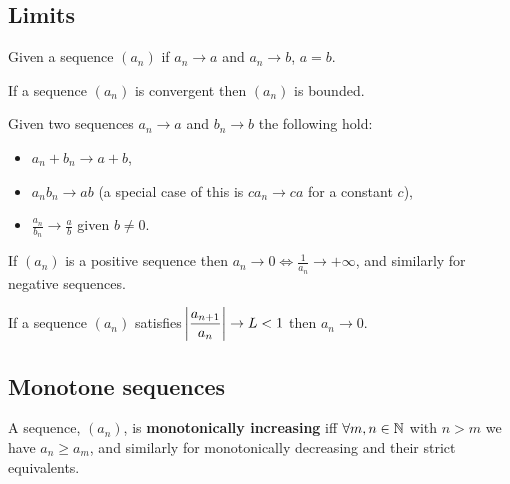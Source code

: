 \documentclass{article}
\begin{document}
\subsection{Limits}

\begin{theorem}
    Given a sequence $(a_n)$ if $a_n\rightarrow a$ and $a_n\rightarrow b$, $a=b$.
\end{theorem}

\begin{theorem}
    If a sequence $(a_n)$ is convergent then $(a_n)$ is bounded.
\end{theorem}

\begin{theorem}
    Given two sequences $a_n\rightarrow a$ and $b_n\rightarrow b$ the following hold: \begin{itemize}
        \item $a_n + b_n \rightarrow a + b$,
        \item $a_nb_n \rightarrow ab$ (a special case of this is $ca_n\rightarrow ca$ for a constant $c$),
        \item $\displaystyle{\frac{a_n}{b_n} \rightarrow \frac{a}{b}}$ given $b\neq0$.
    \end{itemize}
\end{theorem}

\vspace{-15pt}

\begin{theorem}
    If $(a_n)$ is a positive sequence then $a_n\rightarrow0\iff\displaystyle{\frac{1}{a_n}\rightarrow+\infty}$, and similarly for negative sequences.
\end{theorem}

\begin{theorem}
    If a sequence $(a_n)$ satisfies $\displaystyle \abs{\frac{a_{n+1}}{a_n}}\rightarrow L <1$ then $a_n\rightarrow0$.
\end{theorem}

\subsection{Monotone sequences}

\begin{definition}
    A sequence, $(a_n)$, is \textbf{monotonically increasing} iff $\forall m,n\in\mathbb{N}$ with $n>m$ we have $a_n\geq a_m$, and similarly for monotonically decreasing and their strict equivalents.
\end{definition}
\end{document}
